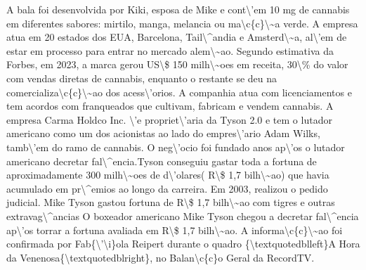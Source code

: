 \documentclass{article}%
\begin{document}
A bala foi desenvolvida por Kiki, esposa de Mike e cont\textbackslash{}'em 10 mg de cannabis em diferentes sabores: mirtilo, manga, melancia ou ma\textbackslash{}c\{c\}\textbackslash{}\textasciitilde{}a verde.\newline%
\newline%
A empresa atua em 20 estados dos EUA, Barcelona, Tail\textbackslash{}\^{}andia e Amsterd\textbackslash{}\textasciitilde{}a, al\textbackslash{}'em de estar em processo para entrar no mercado alem\textbackslash{}\textasciitilde{}ao. Segundo estimativa da Forbes, em 2023, a marca gerou US\textbackslash{}\$ 150 milh\textbackslash{}\textasciitilde{}oes em receita, 30\textbackslash{}\% do valor com vendas diretas de cannabis, enquanto o restante se deu na comercializa\textbackslash{}c\{c\}\textbackslash{}\textasciitilde{}ao dos acess\textbackslash{}'orios.\newline%
\newline%
A companhia atua com licenciamentos e tem acordos com franqueados que cultivam, fabricam e vendem cannabis. A empresa Carma Holdco Inc. \textbackslash{}'e propriet\textbackslash{}'aria da Tyson 2.0 e tem o lutador americano como um dos acionistas ao lado do empres\textbackslash{}'ario Adam Wilks, tamb\textbackslash{}'em do ramo de cannabis.\newline%
\newline%
O neg\textbackslash{}'ocio foi fundado anos ap\textbackslash{}'os o lutador americano decretar fal\textbackslash{}\^{}encia.Tyson conseguiu gastar toda a fortuna de aproximadamente 300 milh\textbackslash{}\textasciitilde{}oes de d\textbackslash{}'olares( R\textbackslash{}\$ 1,7 bilh\textbackslash{}\textasciitilde{}ao) que havia acumulado em pr\textbackslash{}\^{}emios ao longo da carreira. Em 2003, realizou o pedido judicial. Mike Tyson gastou fortuna de R\textbackslash{}\$ 1,7 bilh\textbackslash{}\textasciitilde{}ao com tigres e outras extravag\textbackslash{}\^{}ancias\newline%
\newline%
O boxeador americano Mike Tyson chegou a decretar fal\textbackslash{}\^{}encia ap\textbackslash{}'os torrar a fortuna avaliada em R\textbackslash{}\$ 1,7 bilh\textbackslash{}\textasciitilde{}ao. A informa\textbackslash{}c\{c\}\textbackslash{}\textasciitilde{}ao foi confirmada por Fab\{\textbackslash{}'\textbackslash{}i\}ola Reipert durante o quadro \{\textbackslash{}textquotedblleft\}A Hora da Venenosa\{\textbackslash{}textquotedblright\}, no Balan\textbackslash{}c\{c\}o Geral da RecordTV.\newline%
\end{document}
